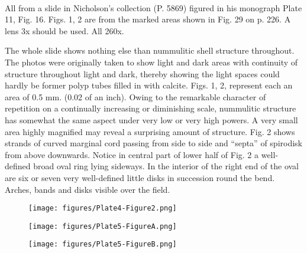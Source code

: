 \documentclass[a4paper, 12pt, oneside]{article}
\begin{document}
\paragraph{}
All from a slide in Nicholson's collection (P. 5869) figured in his monograph Plate 11, Fig. 16. Figs. 1, 2 are from the marked areas shown in Fig. 29 on p. 226. A lens 3x should be used. All 260x.

The whole slide shows nothing else than nummulitic shell structure throughout. The photos were originally taken to show light and dark areas with continuity of structure throughout light and dark, thereby showing the light spaces could hardly be former polyp tubes filled in with calcite. Figs. 1, 2, represent each an area of 0.5 mm. (0.02 of an inch). Owing to the remarkable character of repetition on a continually increasing or diminishing scale, nummulitic structure has somewhat the same aspect under very low or very high powers. A very small area highly magnified may reveal a surprising amount of structure. Fig. 2 shows strands of curved marginal cord passing from side to side and ``septa'' of spirodisk from above downwards. Notice in central part of lower half of Fig. 2 a well-defined broad oval ring lying sideways. In the interior of the right end of the oval are six or seven very well-defined little disks in succession round the bend. Arches, bands and disks visible over the field.
\clearpage
\begin{figure}[b]
\centering
\texttt{[image: figures/Plate4-Figure2.png]}
\caption{}
\end{figure}
\clearpage
{}
\cfoot{\Fontauri{\thepage}}
\begin{figure}[b]
\centering
\texttt{[image: figures/Plate5-FigureA.png]}
\caption{}
\end{figure}
\clearpage
\begin{figure}[b]
\centering
\texttt{[image: figures/Plate5-FigureB.png]}
\caption{}
\end{figure}
\end{document}
